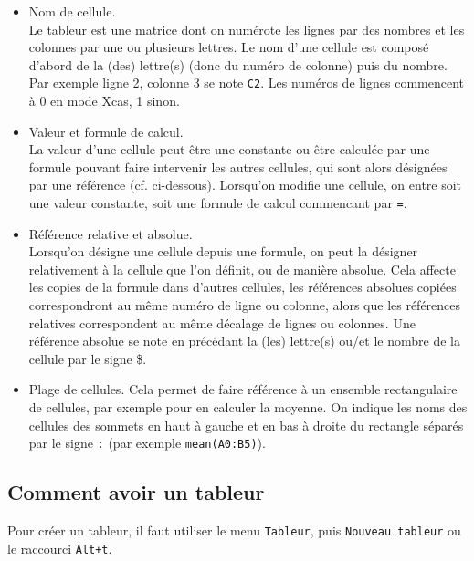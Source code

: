 \documentclass[a4paper,11pt]{article}
\begin{document}
\begin{itemize}
\item Nom de cellule.\\
Le tableur est une matrice dont on num\'erote les lignes par des nombres
et les colonnes par une ou plusieurs lettres. 
Le nom d'une cellule est compos\'e d'abord
de la (des) lettre(s) (donc du num\'ero de colonne) puis du nombre.
Par exemple ligne 2, colonne 3 se note \verb|C2|.
Les num\'eros de lignes commencent \`a 0 en mode Xcas, 1 sinon.
\item Valeur et formule de calcul.\\
La valeur d'une cellule peut \^etre une constante ou \^etre calcul\'ee par une 
formule pouvant faire
intervenir les autres cellules, qui sont alors d\'esign\'ees par une
r\'ef\'erence (cf. ci-dessous). Lorsqu'on modifie une cellule,
on entre soit une valeur constante, soit une formule de calcul
commencant par \verb|=|.
\item R\'ef\'erence relative et absolue.\\
Lorsqu'on d\'esigne une cellule depuis une formule, on peut la d\'esigner
relativement \`a la cellule que l'on d\'efinit, ou
de mani\`ere absolue. Cela affecte les copies de la formule dans d'autres
cellules, les r\'ef\'erences absolues copi\'ees correspondront au m\^eme
num\'ero de ligne ou colonne, alors que les r\'ef\'erences relatives correspondent
au m\^eme d\'ecalage de lignes ou colonnes. Une r\'ef\'erence absolue se note
en pr\'ec\'edant la (les) lettre(s) ou/et le nombre de la cellule par le signe \$.
\item  Plage de cellules.
Cela permet de faire r\'ef\'erence \`a un ensemble rectangulaire de cellules,
par exemple pour en calculer la moyenne. On indique les noms
des cellules des sommets en haut \`a gauche et en bas \`a droite du rectangle 
s\'epar\'es par le signe {\tt :}  (par exemple {\tt mean(A0:B5)}).
\end{itemize}
\subsection{Comment avoir un tableur}
Pour cr\'eer un tableur, 
il faut utiliser le menu {\tt Tableur}, 
puis {\tt Nouveau tableur} ou le raccourci {\tt Alt+t}.
\end{document}
